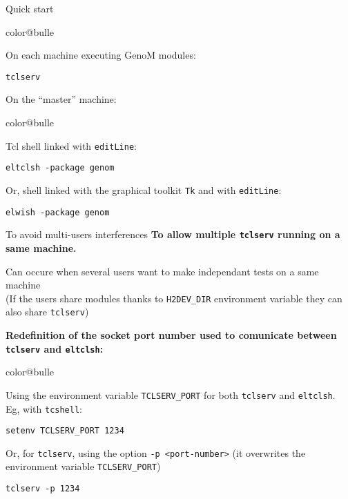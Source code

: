 \documentclass[a4paper,landscape,smooth]{show}
\begin{document}
\begin{tslide}{Quick start}
   \vfill
   \begin{bitemize}{color@bulle}
      \item On each machine executing GenoM modules:\\
   \begin{cartouche}
	 \texttt{tclserv}
   \end{cartouche}

      \item On the ``master'' machine:
	   \begin{bitemize}{color@bulle}
	       \item    Tcl shell linked with \texttt{editLine}:
\begin{cartouche}
\texttt{eltclsh -package genom}
\end{cartouche} 
	       \item Or, shell linked with the graphical toolkit
		     \texttt{Tk} and with \texttt{editLine}:
\begin{cartouche}
\texttt{elwish -package genom}
\end{cartouche} 

	   \end{bitemize}
   \end{bitemize}
   \vfill
\end{tslide}

\begin{tslide}{To avoid multi-users interferences}
   \vfill
   {\bf To allow multiple \texttt{tclserv} running on a same machine.}

	Can occure when several users want to make independant tests on
	a same machine\\
	(If the users share modules thanks to {\tt H2DEV\_DIR}
	environment variable they can also share {\tt tclserv})

   {\bf Redefinition of the socket port number used to comunicate between \texttt{tclserv} and \texttt{eltclsh}:}
   \begin{bitemize}{color@bulle}
      \item Using the environment variable \texttt{TCLSERV\_PORT} for
	    both \texttt{tclserv} and \texttt{eltclsh}. \\
Eg, with \texttt{tcshell}:\\
   \begin{cartouche}
   \texttt{setenv TCLSERV\_PORT 1234}
   \end{cartouche}   
	 
      \item Or, for \texttt{tclserv}, using the  option {\tt -p
	    <port-number>} (it overwrites the environment variable \texttt{TCLSERV\_PORT})\\
   \begin{cartouche}
   \texttt{tclserv -p 1234}
   \end{cartouche}   

   \end{bitemize}

   \vfill
\end{tslide}
\end{document}
